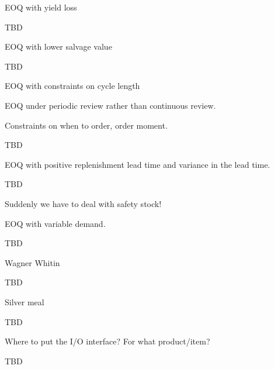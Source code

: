\begin{exercise}
EOQ with yield loss
  \begin{solution}
    TBD
  \end{solution}
\end{exercise}

\begin{exercise}
EOQ with lower salvage value
  \begin{solution}
    TBD
  \end{solution}
\end{exercise}


\begin{exercise}
EOQ with constraints on cycle length

EOQ under periodic review rather than continuous review.

Constraints on when to order, order moment.

  \begin{solution}
    TBD
  \end{solution}
\end{exercise}


\begin{exercise}
  EOQ with positive replenishment lead time and variance in the lead
  time.

  \begin{solution}
    TBD

Suddenly we have to deal with safety stock!
  \end{solution}
\end{exercise}

\begin{exercise}
EOQ with variable demand.
  \begin{solution}
    TBD
  \end{solution}
\end{exercise}

\begin{exercise}
Wagner Whitin
  \begin{solution}
    TBD
  \end{solution}
\end{exercise}

\begin{exercise}
Silver meal
  \begin{solution}
    TBD
  \end{solution}
\end{exercise}

\begin{exercise}
Where to put the I/O interface? For what product/item?
  \begin{solution}
    TBD
  \end{solution}
\end{exercise}

